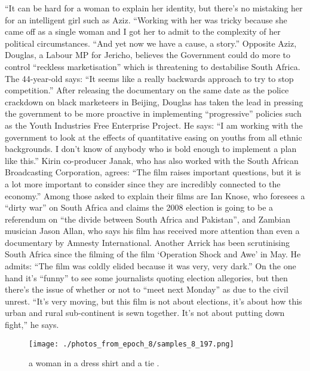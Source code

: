 \documentclass{article}%
\begin{document}
“It can be hard for a woman to explain her identity, but there’s no mistaking her for an intelligent girl such as Aziz.\newline%
“Working with her was tricky because she came off as a single woman and I got her to admit to the complexity of her political circumstances. “And yet now we have a cause, a story.”\newline%
Opposite Aziz, Douglas, a Labour MP for Jericho, believes the Government could do more to control “reckless marketisation” which is threatening to destabilise South Africa.\newline%
The 44{-}year{-}old says: “It seems like a really backwards approach to try to stop competition.”\newline%
After releasing the documentary on the same date as the police crackdown on black marketeers in Beijing, Douglas has taken the lead in pressing the government to be more proactive in implementing “progressive” policies such as the Youth Industries Free Enterprise Project.\newline%
He says: “I am working with the government to look at the effects of quantitative easing on youths from all ethnic backgrounds. I don’t know of anybody who is bold enough to implement a plan like this.”\newline%
Kirin co{-}producer Janak, who has also worked with the South African Broadcasting Corporation, agrees: “The film raises important questions, but it is a lot more important to consider since they are incredibly connected to the economy.”\newline%
Among those asked to explain their films are Ian Knose, who foresees a “dirty war” on South Africa and claims the 2008 election is going to be a referendum on “the divide between South Africa and Pakistan”, and Zambian musician Jason Allan, who says his film has received more attention than even a documentary by Amnesty International.\newline%
Another Arrick has been scrutinising South Africa since the filming of the film ‘Operation Shock and Awe’ in May.\newline%
He admits: “The film was coldly elided because it was very, very dark.”\newline%
On the one hand it’s “funny” to see some journalists quoting election allegories, but then there’s the issue of whether or not to “meet next Monday” as due to the civil unrest.\newline%
“It’s very moving, but this film is not about elections, it’s about how this urban and rural sub{-}continent is sewn together. It’s not about putting down fight,” he says.\newline%

%


\begin{figure}[h!]%
\centering%
\texttt{[image: ./photos\_from\_epoch\_8/samples\_8\_197.png]}%
\caption{a woman in a dress shirt and a tie .}%
\end{figure}

%
\end{document}

